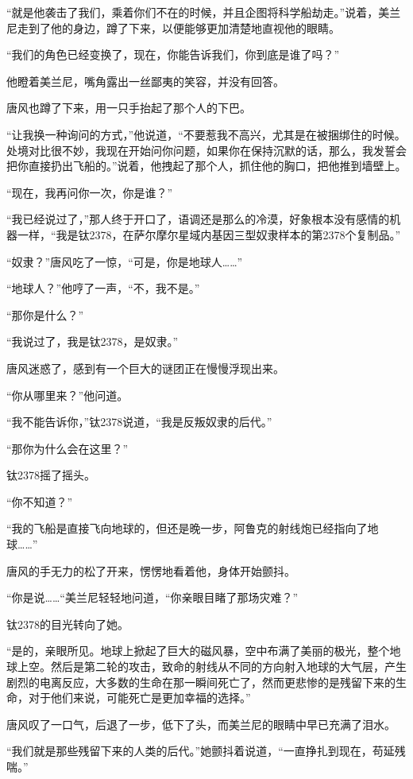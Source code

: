 “就是他袭击了我们，乘着你们不在的时候，并且企图将科学船劫走。”说着，美兰尼走到了他的身边，蹲了下来，以便能够更加清楚地直视他的眼睛。 

“我们的角色已经变换了，现在，你能告诉我们，你到底是谁了吗？” 

他瞪着美兰尼，嘴角露出一丝鄙夷的笑容，并没有回答。 

唐风也蹲了下来，用一只手抬起了那个人的下巴。 

“让我换一种询问的方式，”他说道，“不要惹我不高兴，尤其是在被捆绑住的时候。处境对比很不妙，我现在开始问你问题，如果你在保持沉默的话，那么，我发誓会把你直接扔出飞船的。”说着，他拽起了那个人，抓住他的胸口，把他推到墙壁上。 

“现在，我再问你一次，你是谁？” 

“我已经说过了，”那人终于开口了，语调还是那么的冷漠，好象根本没有感情的机器一样，“我是钛2378，在萨尔摩尔星域内基因三型奴隶样本的第2378个复制品。” 

“奴隶？”唐风吃了一惊，“可是，你是地球人……” 

“地球人？”他哼了一声，“不，我不是。” 

“那你是什么？” 

“我说过了，我是钛2378，是奴隶。” 

唐风迷惑了，感到有一个巨大的谜团正在慢慢浮现出来。 

“你从哪里来？”他问道。 

“我不能告诉你，”钛2378说道，“我是反叛奴隶的后代。” 

“那你为什么会在这里？” 

钛2378摇了摇头。 

“你不知道？” 

“我的飞船是直接飞向地球的，但还是晚一步，阿鲁克的射线炮已经指向了地球……” 

唐风的手无力的松了开来，愣愣地看着他，身体开始颤抖。 

“你是说……“美兰尼轻轻地问道，“你亲眼目睹了那场灾难？” 

钛2378的目光转向了她。 

“是的，亲眼所见。地球上掀起了巨大的磁风暴，空中布满了美丽的极光，整个地球上空。然后是第二轮的攻击，致命的射线从不同的方向射入地球的大气层，产生剧烈的电离反应，大多数的生命在那一瞬间死亡了，然而更悲惨的是残留下来的生命，对于他们来说，可能死亡是更加幸福的选择。” 

唐风叹了一口气，后退了一步，低下了头，而美兰尼的眼睛中早已充满了泪水。 

“我们就是那些残留下来的人类的后代。”她颤抖着说道，“一直挣扎到现在，苟延残喘。” 

